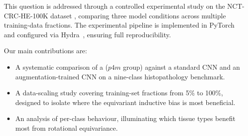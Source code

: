 This question is addressed through a controlled experimental study on the NCT-CRC-HE-100K
dataset \citep{kather2018100}, comparing three model conditions across multiple training-data
fractions. The experimental pipeline is implemented in PyTorch~\citep{paszke2019pytorch}
and configured via Hydra~\citep{yadan2019hydra}, ensuring full reproducibility.

Our main contributions are:
\begin{itemize}
  \item A systematic comparison of a \gcnn{} (\(p4m\) group) against a standard CNN and an
    augmentation-trained CNN on a nine-class histopathology benchmark.
  \item A data-scaling study covering training-set fractions from 5\% to 100\%, designed to
    isolate where the equivariant inductive bias is most beneficial.
  \item An analysis of per-class behaviour, illuminating which tissue types benefit most from
    rotational equivariance.
\end{itemize}